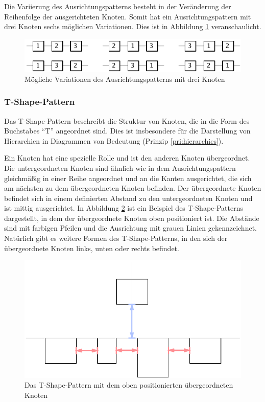 Die Variierung des Ausrichtungspatterns besteht in der Veränderung der Reihenfolge der ausgerichteten Knoten. Somit hat ein Ausrichtungspattern mit drei Knoten sechs möglichen Variationen. Dies ist in Abbildung \ref{fig:layout-pattern-alignment-variations} veranschaulicht.

\begin{figure}[hbt]
    \centering
    \includegraphics[scale=1.3]{resources/layout-pattern-alignment-variations}
    \caption{Mögliche Variationen des Ausrichtungspatterns mit drei Knoten}
    \label{fig:layout-pattern-alignment-variations}
\end{figure}

\subsubsection{T-Shape-Pattern}
\label{subsubsec:t-shape-pattern}

Das T-Shape-Pattern beschreibt die Struktur von Knoten, die in die Form des Buchstabes \enquote{T} angeordnet sind. Dies ist insbesondere für die Darstellung von Hierarchien in Diagrammen von Bedeutung (Prinzip \ref{pri:hierarchies}).

Ein Knoten hat eine spezielle Rolle und ist den anderen Knoten übergeordnet. Die untergeordneten Knoten sind ähnlich wie in dem Ausrichtungspattern gleichmäßig in einer Reihe angeordnet und an die Kanten ausgerichtet, die sich am nächsten zu dem übergeordneten Knoten befinden. Der übergeordnete Knoten befindet sich in einem definierten Abstand zu den untergeordneten Knoten und ist mittig ausgerichtet. In Abbildung \ref{fig:layout-pattern-t-shape} ist ein Beispiel des T-Shape-Patterns dargestellt, in dem der übergeordnete Knoten oben positioniert ist. Die Abstände sind mit farbigen Pfeilen und die Ausrichtung mit grauen Linien gekennzeichnet. Natürlich gibt es weitere Formen des T-Shape-Patterns, in den sich der übergeordnete Knoten links, unten oder rechts befindet.

\begin{figure}[hbt]
    \centering
    \includegraphics{resources/layout-pattern-t-shape}
    \caption{Das T-Shape-Pattern mit dem oben positionierten übergeordneten Knoten}
    \label{fig:layout-pattern-t-shape}
\end{figure}

